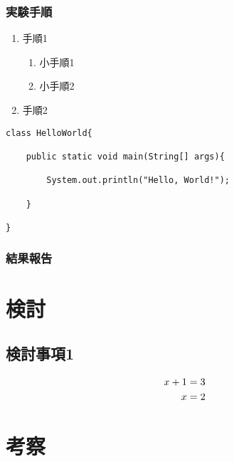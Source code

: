 \documentclass[10pt]{jsarticle}
\begin{document}
\subsubsection{実験手順}
\begin{enumerate}
\item{手順1}
	\begin{enumerate}
		\item{小手順1}
		\item{小手順2}
	\end{enumerate}
\item{手順2}
\end{enumerate}

\begin{mdframed}[roundcorner=0.5zw,skipabove=1zw,skipbelow=1zw,innertopmargin=1zw,innerbottommargin=1zw,innerleftmargin=0.8zw,innerrightmargin=0.8zw,backgroundcolor=black!10]
\small{
\begin{verbatim}
class HelloWorld{
    
    public static void main(String[] args){
        
        System.out.println("Hello, World!");
        
    }
    
}
\end{verbatim}}
\end{mdframed}

\subsubsection{結果報告}

\newpage

\section{検討}
\subsection{検討事項1}
\begin{align}
x+1&=3 \notag \\
x&=2
\end{align}

\newpage

\section{考察}
\end{document}
